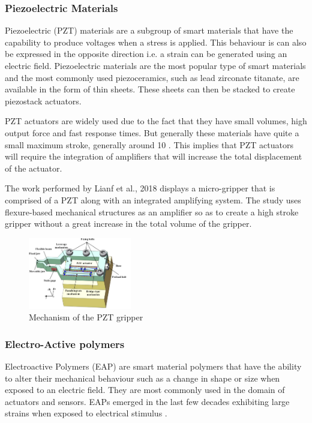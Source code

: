 \subsubsection{Piezoelectric Materials}
Piezoelectric (PZT) materials are a subgroup of smart materials that have the capability to produce voltages when a stress is applied. This behaviour is can also be expressed in the opposite direction i.e. a strain can be generated using an electric field. Piezoelectric materials are the most popular type of smart materials and the most commonly used piezoceramics, such as lead zirconate titanate, are available in the form of thin sheets. These sheets can then be stacked to create piezostack actuators.

PZT actuators are widely used due to the fact that they have small volumes, high output force and fast response times. But generally these materials have quite a small maximum stroke, generally around 10 \micrometer. This implies that PZT actuators will require the integration of amplifiers that will increase the total displacement of the actuator.

The work performed by Lianf et al., 2018\cite{liang_design_2018} displays a micro-gripper that is comprised of a PZT along with an integrated amplifying system. The study uses flexure-based mechanical structures as an amplifier so as to create a high stroke gripper without a great increase in the total volume of the gripper.
\begin{figure}[H]
	\centering
	\includegraphics[width=0.4\textwidth]{Figures/PZT_grip.png}
	\caption{Mechanism of the PZT gripper\cite{liang_design_2018}}
	\label{fig:PZT_grip}
\end{figure}



\subsubsection{Electro-Active polymers}
Electroactive Polymers (EAP) are smart material polymers that have the ability to alter their mechanical behaviour such as a change in shape or size when exposed to an electric field. They are most commonly used in the domain of actuators and sensors. EAPs emerged in the last few decades exhibiting large strains when exposed to electrical stimulus \cite{bar-cohen_artificial_2005}.

